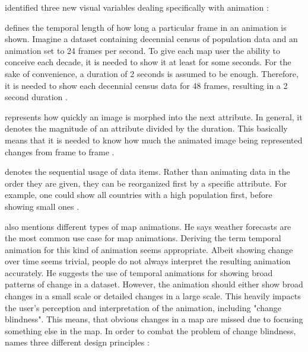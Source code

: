 \citeauthor{DiBiase1992} identified three new visual variables dealing specifically with animation :

\begin{enumerate}

 defines the temporal length of how long a particular frame in an animation is shown. Imagine a dataset containing decennial census of population data and an animation set to 24 frames per second. To give each map user the ability to conceive each decade, it is needed to show it at least for some seconds. For the sake of convenience, a duration of 2 seconds is assumed to be enough. Therefore, it is needed to show each decennial census data for 48 frames, resulting in a 2 second duration .

 represents how quickly an image is morphed into the next attribute. In general, it denotes the magnitude of an attribute divided by the duration. This basically means that it is needed to know how much the animated image being represented changes from frame to frame .

 denotes the sequential usage of data items. Rather than animating data in the order they are given, they can be reorganized first by a specific attribute. For example, one could show all countries with a high population first, before showing small ones .

\end{enumerate}

\citeauthor{Muehlenhaus2014} also mentions different types of map animations. He says weather forecasts are the most common use case for map animations. Deriving the term temporal animation for this kind of animation seems appropriate. Albeit showing change over time seems trivial, people do not always interpret the resulting animation accurately. He suggests the use of temporal animations for showing broad patterns of change in a dataset. However, the animation should either show broad changes in a small scale or detailed changes in a large scale. This heavily impacts the user's perception and interpretation of the animation, including "change blindness". This means, that obvious changes in a map are missed due to focusing something else in the map. In order to combat the problem of change blindness, \citeauthor{Muehlenhaus2014} names three different design principles :

